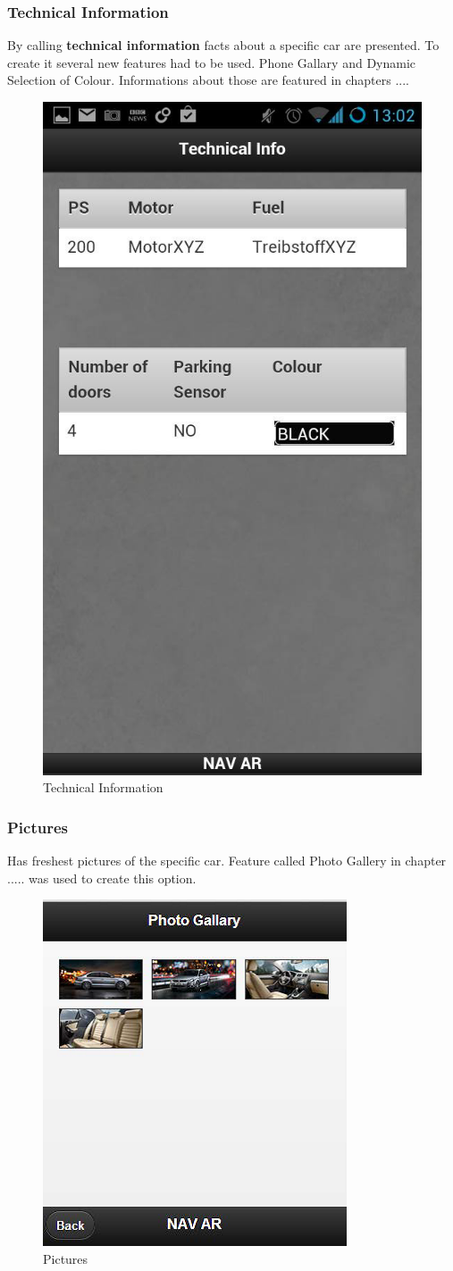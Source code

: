 \subsubsection{Technical Information}
By calling \textbf{technical information} facts about a specific car are presented. To create it several new features had to be used. Phone Gallary and Dynamic Selection of Colour. Informations about those are featured in chapters ....
\\
\begin{figure}[h]
\centering
\includegraphics[width=0.4\linewidth]{graphics/chapter4/6}
\caption{Technical Information}
\label{fig:7}
\end{figure}
\newpage

\subsubsection{Pictures}
Has freshest pictures of the specific car. Feature called Photo Gallery in chapter ..... was used to create this option.
\\
\begin{figure}[h]
\centering
\includegraphics[width=0.5\linewidth]{graphics/chapter4/7}
\caption{Pictures}
\label{fig:8}
\end{figure}
\newpage

